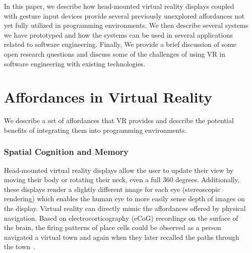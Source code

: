 \documentclass[conference]{IEEEtran}
\begin{document}
In this paper, we describe how head-mounted virtual reality displays coupled with gesture input devices provide several previously unexplored affordances not yet fully utilized in programming environments. 
We then describe several systems we have prototyped and how the systems can be used in several applications related to software engineering.  Finally, We provide a brief discussion of some open research questions and discuss some of the challenges of using VR in software engineering with existing technologies.






\section{Affordances in Virtual Reality}
We describe a set of affordances that VR provides and describe the potential benefits of integrating them into programming environments.

\subsubsection{Spatial Cognition and Memory}

Head-mounted virtual reality displays allow the user to update their view by moving their body or rotating their neck, even a full 360 degrees.
Additionally, these displays render a slightly different image for each eye (stereoscopic rendering) which enables the human eye to more easily sense depth of images on the display.
Virtual reality can directly mimic the affordances offered by physical navigation. Based on electrocorticography (eCoG) recordings on the surface of the brain, the firing patterns of place cells could be observed as a person navigated a virtual town and again when they later recalled the paths through the town~\cite{Ekstrom:2003}.
\end{document}
